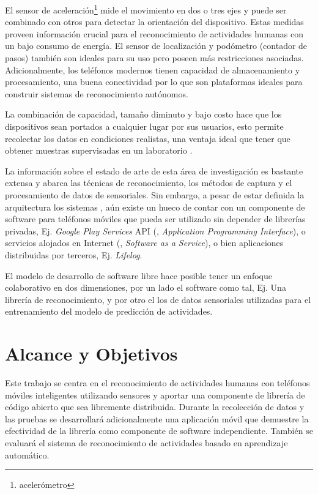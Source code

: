 El sensor de aceleración\footnote{acelerómetro} mide el movimiento
en dos o tres ejes y puede ser combinado con otros para detectar la
orientación del dispositivo. Estas medidas proveen información crucial
para el reconocimiento de actividades humanas con un bajo consumo
de energía. El sensor de localización y podómetro (contador de pasos)
también son ideales para su uso pero poseen más restricciones asociadas.
Adicionalmente, los teléfonos modernos tienen capacidad de almacenamiento
y procesamiento, una buena conectividad por lo que son plataformas
ideales para construir sistemas de reconocimiento autónomos.

La combinación de capacidad, tamaño diminuto y bajo costo hace que
los dispositivos sean portados a cualquier lugar por sus usuarios,
esto permite recolectar los datos en condiciones realistas, una ventaja
ideal que tener que obtener muestras supervisadas en un laboratorio
\cite{Bao2004}. 

La información sobre el estado de arte de esta área de investigación
es bastante extensa y abarca las técnicas de reconocimiento, los métodos
de captura y el procesamiento de datos de sensoriales\cite{LaraLabrador2012,Kwapisz2011}.
Sin embargo, a pesar de estar definida la arquitectura los sistemas
, aún existe un hueco de contar con un componente de software
para teléfonos móviles que pueda ser utilizado sin depender de librerías
privadas, Ej. \emph{Google Play Services} API \cite{Google2016l}
(, \emph{Application Programming Interface}), o servicios
alojados en Internet (, \emph{Software as a Service}),
o bien aplicaciones distribuidas por terceros, Ej. \emph{Lifelog}.

El modelo de desarrollo de software libre hace posible tener un enfoque
colaborativo en dos dimensiones, por un lado el software como tal,
Ej. Una librería de reconocimiento, y por otro el los de datos sensoriales
utilizadas para el entrenamiento del modelo de predicción de actividades.

\section{Alcance y Objetivos}

\label{sec13:alcance-y-objetivos}

Este trabajo se centra en el reconocimiento de actividades humanas
con teléfonos móviles inteligentes utilizando sensores y aportar una
componente de librería de código abierto que sea libremente distribuida.
Durante la recolección de datos y las pruebas se desarrollará adicionalmente
una aplicación móvil que demuestre la efectividad de la librería como
componente de software independiente. También se evaluará el sistema
de reconocimiento de actividades basado en aprendizaje automático.

